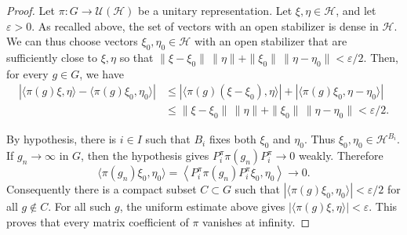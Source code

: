 \documentclass[10pt,a4paper]{amsart}
\begin{document}
\begin{proof}
Let \(\pi \colon G\to\mathcal U(\mathcal H)\) be a unitary
representation. Let \(\xi,\eta\in\mathcal H\), and let \(\varepsilon>0\). As recalled above, the set of  vectors with an open stabilizer is  dense in
\(\mathcal H\). We can thus choose vectors
\(\xi_0,\eta_0\in\mathcal H\) with an open stabilizer that are sufficiently close to $\xi, \eta$ so that
$
\|\xi-\xi_0\|\,\|\eta\|+\|\xi_0\|\,\|\eta-\eta_0\|
<
\varepsilon/2.
$
Then, for every \(g\in G\), we have
\[
\begin{aligned}
\left|
\langle \pi(g)\xi,\eta\rangle
-
\langle \pi(g)\xi_0,\eta_0\rangle
\right|
&\leq
\left|\langle \pi(g)(\xi-\xi_0),\eta\rangle\right|
+
\left|\langle \pi(g)\xi_0,\eta-\eta_0\rangle\right| \\
&\leq
\|\xi-\xi_0\|\,\|\eta\|
+
\|\xi_0\|\,\|\eta-\eta_0\| < \varepsilon/2.
\end{aligned}
\]

By hypothesis, there is $i \in I$ such that $B_i$ fixes both $\xi_0$ and $\eta_0$. 
Thus \(\xi_0,\eta_0\in\mathcal H^{B_i}\). If \(g_n\to\infty\) in \(G\),
then the hypothesis gives
$
P_i^\pi\pi(g_n)P_i^\pi\to 0
$
weakly. Therefore
$$
\langle \pi(g_n)\xi_0,\eta_0\rangle
=
\left\langle
P_i^\pi\pi(g_n)P_i^\pi \xi_0,\eta_0
\right\rangle
\to 0.
$$
Consequently there is a compact subset \(C\subset G\) such that
$
\left|\langle \pi(g)\xi_0,\eta_0\rangle\right|
<
\varepsilon/2
$
for all \(g\notin C\). For all such \(g\), the uniform estimate above gives
$
\left|\langle \pi(g)\xi,\eta\rangle\right|
<
\varepsilon.
$
This proves that every matrix coefficient of \(\pi\) vanishes at infinity. 
\end{proof}
\end{document}
